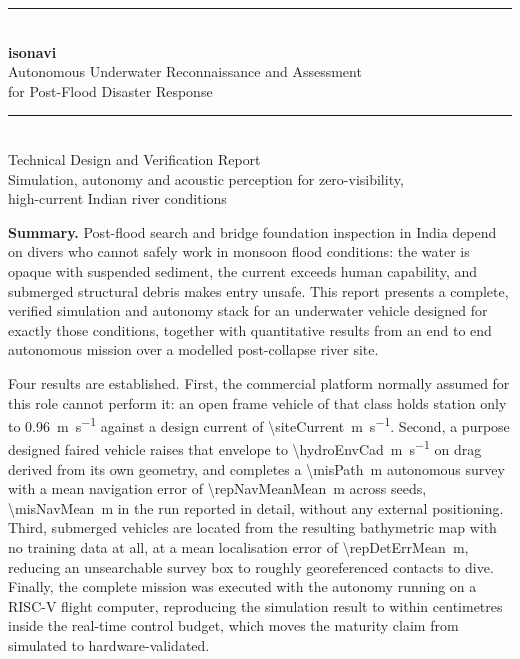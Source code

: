 \documentclass[10pt,a4paper]{article}
\begin{document}
\begin{titlepage}
\centering
\vspace*{0.35cm}
{\color{accent}\rule{\linewidth}{1.2pt}}\\[4mm]
{\Huge\bfseries isonavi}\\[3mm]
{\Large Autonomous Underwater Reconnaissance and Assessment\\ for Post-Flood Disaster Response}\\[2mm]
{\color{accent}\rule{\linewidth}{1.2pt}}\\[6mm]

{\large Technical Design and Verification Report}\\[3mm]
{\normalsize Simulation, autonomy and acoustic perception for zero-visibility,\\ high-current Indian river conditions}\\[8mm]

\begin{minipage}{0.86\linewidth}
\small
\textbf{Summary.} Post-flood search and bridge foundation inspection in India
depend on divers who cannot safely work in monsoon flood conditions: the water
is opaque with suspended sediment, the current exceeds human capability, and
submerged structural debris makes entry unsafe. This report presents a
complete, verified simulation and autonomy stack for an underwater vehicle
designed for exactly those conditions, together with quantitative results from
an end to end autonomous mission over a modelled post-collapse river site.

Four results are established. First, the commercial platform normally assumed
for this role cannot perform it: an open frame vehicle of that class holds
station only to \SI{0.96}{\metre\per\second} against a design current of
\SI{\siteCurrent}{\metre\per\second}. Second, a purpose designed faired
vehicle raises that envelope to \SI{\hydroEnvCad}{\metre\per\second} on drag
derived from its own geometry, and completes a \SI{\misPath}{\metre} autonomous
survey with a mean navigation error of \SI{\repNavMeanMean}{\metre} across
\repRuns{} seeds, \SI{\misNavMean}{\metre} in the run reported in detail, without any
external positioning. Third,
submerged vehicles are located from the resulting bathymetric map with no
training data at all, at a mean localisation error of
\SI{\repDetErrMean}{\metre}, reducing an unsearchable survey box to roughly
\detContacts{} georeferenced contacts to dive. Finally, the complete mission was executed with the
autonomy running on a RISC-V flight computer, reproducing the simulation result
to within centimetres inside the real-time control budget, which moves the
maturity claim from simulated to hardware-validated.
\end{minipage}


\end{titlepage}
\end{document}
